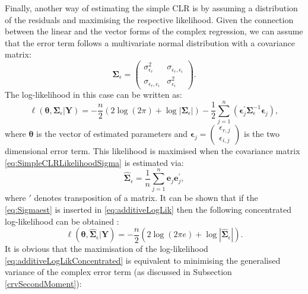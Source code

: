 \documentclass[
]{book}
\begin{document}
Finally, another way of estimating the simple CLR is by assuming a distribution of the residuals and maximising the respective likelihood. Given the connection between the linear and the vector forms of the complex regression, we can assume that the error term follows a multivariate normal distribution with a covariance matrix:
\begin{equation}
    \boldsymbol{\Sigma}_\epsilon = \begin{pmatrix} \sigma_{\epsilon_r}^2 & \sigma_{\epsilon_r, \epsilon_i} \\ \sigma_{\epsilon_r, \epsilon_i} & \sigma_{\epsilon_i}^2 \end{pmatrix} .
    \label{eq:SimpleCLRLikelihoodSigma}
\end{equation}
The log-likelihood in this case can be written as:
\begin{equation}
    \ell(\boldsymbol{\theta}, \boldsymbol{\Sigma}_\epsilon | \mathbf{Y}) = -\frac{n}{2} \left( 2 \log(2 \pi) + \log | \boldsymbol{\Sigma}_\epsilon| \right) -\frac{1}{2} \sum_{j=1}^n \left( \boldsymbol{\epsilon}_j^\prime \boldsymbol{\Sigma}_\epsilon^{-1} \boldsymbol{\epsilon}_j \right) ,
    \label{eq:additiveLogLik}
\end{equation}
where \(\boldsymbol{\theta}\) is the vector of estimated parameters and \(\boldsymbol{\epsilon}_j = \begin{pmatrix} \epsilon_{r,j} \\ \epsilon_{i,j} \end{pmatrix}\) is the two dimensional error term. This likelihood is maximised when the covariance matrix \eqref{eq:SimpleCLRLikelihoodSigma} is estimated via:
\begin{equation}
    \hat{\boldsymbol{\Sigma}}_\epsilon = \frac{1}{n} \sum_{j=1}^{n} \boldsymbol{e}_j \boldsymbol{e}_j^\prime ,
    \label{eq:Sigmaest}
\end{equation}
where \(\prime\) denotes transposition of a matrix. It can be shown that if the \eqref{eq:Sigmaest} is inserted in \eqref{eq:additiveLogLik} then the following concentrated log-likelihood can be obtained \citep[see, for example,][]{Snyder2017}:
\begin{equation}
    \ell(\boldsymbol{\theta}, \hat{\boldsymbol{\Sigma}}_\epsilon | \mathbf{Y}) = -\frac{n}{2} \left( 2 \log(2 \pi e) + \log | \hat{\boldsymbol{\Sigma}}_\epsilon | \right) .
    \label{eq:additiveLogLikConcentrated}
\end{equation}
It is obvious that the maximisation of the log-likelihood \eqref{eq:additiveLogLikConcentrated} is equivalent to minimising the generalised variance of the complex error term (as discussed in Subsection \ref{crvSecondMoment}):
\end{document}
